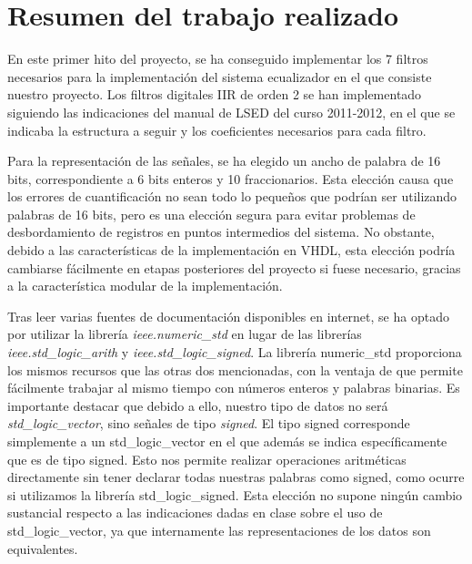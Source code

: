 \documentclass[a4paper,12pt]{article}
\begin{document}


\section{Resumen del trabajo realizado}
En este primer hito del proyecto, se ha conseguido implementar los 7 filtros necesarios para la implementación del sistema ecualizador en el que consiste nuestro proyecto. Los filtros digitales IIR de orden 2 se han implementado siguiendo las indicaciones del manual de LSED del curso 2011-2012, en el que se indicaba la estructura a seguir y los coeficientes necesarios para cada filtro.

Para la representación de las señales, se ha elegido un ancho de palabra de 16 bits, correspondiente a 6 bits enteros y 10 fraccionarios. Esta elección causa que los errores de cuantificación no sean todo lo pequeños que podrían ser utilizando palabras de 16 bits, pero es una elección segura para evitar problemas de desbordamiento de registros en puntos intermedios del sistema. No obstante, debido a las características de la implementación en VHDL, esta elección podría cambiarse fácilmente en etapas posteriores del proyecto si fuese necesario, gracias a la característica modular de la implementación.

Tras leer varias fuentes de documentación disponibles en internet, se ha optado por utilizar la librería \emph{ieee.numeric_std} en lugar de las librerías \emph{ieee.std_logic_arith} y \emph{ieee.std_logic_signed}. La librería numeric_std proporciona los mismos recursos que las otras dos mencionadas, con la ventaja de que permite fácilmente trabajar al mismo tiempo con números enteros y palabras binarias. Es importante destacar que debido a ello, nuestro tipo de datos no será \emph{std_logic_vector}, sino señales de tipo \emph{signed}. El tipo signed corresponde simplemente a un std_logic_vector en el que además se indica específicamente que es de tipo signed. Esto nos permite realizar operaciones aritméticas directamente sin tener declarar todas nuestras palabras como signed, como ocurre si utilizamos la librería std_logic_signed. Esta elección no supone ningún cambio sustancial respecto a las indicaciones dadas en clase sobre el uso de std_logic_vector, ya que internamente las representaciones de los datos son equivalentes.
\end{document}
